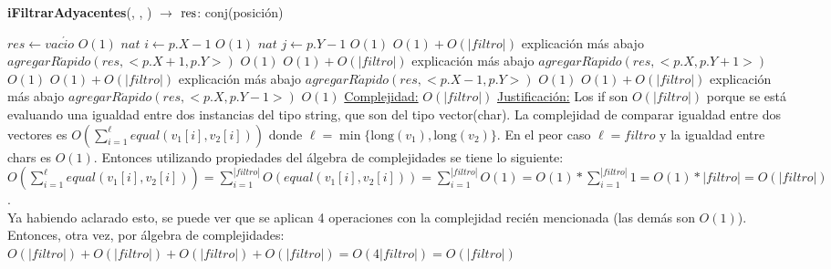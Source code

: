 \begin{Algoritmos}
\begin{algorithm}[H]{\textbf{iFiltrarAdyacentes}(, , ) $\to$ $\res$: conj(posici\'on)}
	\begin{algorithmic}
    	\State $res \gets vac\acute{i}o$	\Comment $O(1)$
    	\State $nat$ $i \gets p.X-1$	\Comment $O(1)$
    	\State $nat$ $j \gets p.Y-1$	\Comment $O(1)$
    		\Comment $O(1) + O(|filtro|)$  explicaci\'on m\'as abajo
        	\State $agregarR\acute{a}pido(res,<p.X+1,p.Y>)$	\Comment $O(1)$
        \EndIf
        	\Comment $O(1) + O(|filtro|)$ explicaci\'on m\'as abajo
        	\State $agregarR\acute{a}pido(res,<p.X,p.Y+1>)$	\Comment $O(1)$
        \EndIf
        	\Comment $O(1) + O(|filtro|)$ explicaci\'on m\'as abajo
        	\State $agregarR\acute{a}pido(res,<p.X-1,p.Y>)$	\Comment $O(1)$
        \EndIf
        	\Comment $O(1) + O(|filtro|)$ explicaci\'on m\'as abajo
        	\State $agregarR\acute{a}pido(res,<p.X,p.Y-1>)$	\Comment $O(1)$
        \EndIf
        \medskip
		\Statex \underline{Complejidad:} $O(|filtro|)$
        \Statex \underline{Justificaci\'on:} Los if son $O(|filtro|)$ porque se est\'a evaluando una igualdad entre dos instancias del tipo string, que son del tipo vector(char). La complejidad de comparar igualdad entre dos vectores es $\displaystyle O\left(\sum_{i=1}^\ell{equal(v_1[i],v_2[i])}\right)$ donde $\ell = \min\{\text{long}(v_1), \text{long}(v_2)\}$. En el peor caso $\ell = filtro$ y la igualdad entre chars es $O(1)$. Entonces utilizando propiedades del \'algebra de complejidades se tiene lo siguiente: $\displaystyle O\left(\sum_{i=1}^\ell{equal(v_1[i],v_2[i])}\right) = \sum_{i=1}^{|filtro|}{O(equal(v_1[i],v_2[i]))} = \sum_{i=1}^{|filtro|}{O(1)} = O(1)*\sum_{i=1}^{|filtro|}{1} = O(1)*|filtro| = O(|filtro|)$. \\
        Ya habiendo aclarado esto, se puede ver que se aplican 4 operaciones con la complejidad reci\'en mencionada (las dem\'as son $O(1)$). Entonces, otra vez, por \'algebra de complejidades: $O(|filtro|) + O(|filtro|) + O(|filtro|) + O(|filtro|) = O(4|filtro|) = O(|filtro|)$
	\end{algorithmic}
\end{algorithm}



\end{Algoritmos}
